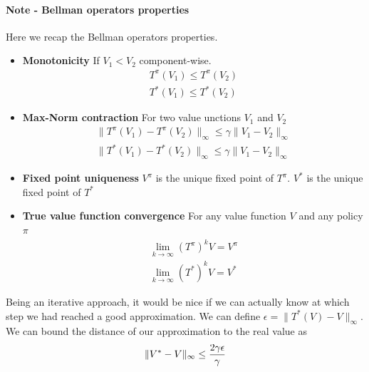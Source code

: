 \documentclass[main.tex]{subfiles}
\begin{document}
\paragraph{Note - Bellman operators properties} Here we recap the Bellman operators properties.
\begin{itemize}
    \item \textbf{Monotonicity} If $V_1 < V_2$ component-wise.
    \begin{align*}
        T^{\pi}(V_1) \leq T^{\pi}(V_2) \\
        T^*(V_1) \leq T^*(V_2)
    \end{align*}
    \item \textbf{Max-Norm contraction} For two value unctions $V_1$ and $V_2$ \footnotemark {}
    \begin{align*}
        \|T^{\pi}(V_1) - T^{\pi}(V_2)\|_{\infty} \leq \gamma \|V_1 - V_2\|_{\infty} \\
        \|T^*(V_1) - T^*(V_2)\|_{\infty} \leq \gamma \|V_1 - V_2\|_{\infty}
    \end{align*}
    \item \textbf{Fixed point uniqueness} $V^{\pi}$ is the unique fixed point of $T^{\pi}$. $V^*$ is the unique fixed point of $T^*$
    \item \textbf{True value function convergence} For any value function $V$ and any policy $\pi$
    \begin{align*}
        \lim_{k \rightarrow \infty} (T^{\pi})^k V = V^{\pi} \\
        \lim_{k \rightarrow \infty} (T^*)^k V = V^*
    \end{align*}
\end{itemize}
\par
\noindent
Being an iterative approach, it would be nice if we can actually know at which step we had reached a good approximation. We can define $\epsilon = \|T^*(V) - V\|_{\infty}$. We can bound the distance of our approximation to the real value as
\begin{equation}
    \|V^* - V\|_{\infty} \leq \frac{2 \gamma \epsilon}{\- \gamma}
\end{equation}
\end{document}
